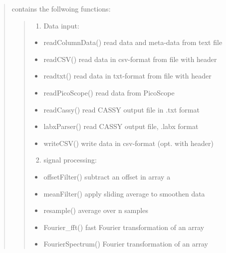 \documentclass[letterpaper,10pt,english]{sphinxmanual}
\begin{document}
\begin{quote}

contains the follwoing functions:
\begin{quote}
\begin{enumerate}
\item {} 
Data input:

\end{enumerate}
\begin{itemize}
\item {} 
readColumnData() read data and meta-data from text file

\item {} 
readCSV()        read data in csv-format from file with header

\item {} 
readtxt()        read data in \sphinxquotedblleft{}txt\sphinxquotedblright{}-format from file with header

\item {} 
readPicoScope()  read data from PicoScope

\item {} 
readCassy()      read CASSY output file in .txt format

\item {} 
labxParser()     read CASSY output file, .labx format

\item {} 
writeCSV()       write data in csv-format (opt. with header)

\end{itemize}
\begin{enumerate}
\setcounter{enumi}{1}
\item {} 
signal processing:

\end{enumerate}
\begin{itemize}
\item {} 
offsetFilter()     subtract an offset in array a

\item {} 
meanFilter()       apply sliding average to smoothen data

\item {} 
resample()         average over n samples

\item {} 
Fourier\_fft()      fast Fourier transformation of an array

\item {} 
FourierSpectrum()  Fourier transformation of an array 


\end{itemize}
\end{quote}
\end{quote}
\end{document}
